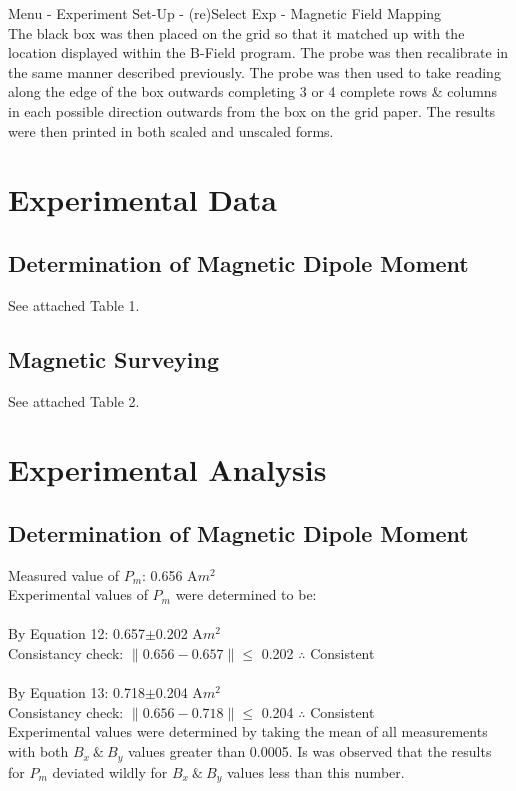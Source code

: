 \documentclass{article}
\begin{document}
Menu - Experiment Set-Up - (re)Select Exp - Magnetic Field Mapping\\

The black box was then placed on the grid so that it matched up with the location displayed within the B-Field program. The probe was then recalibrate in the same manner described previously. The probe was then used to take reading along the edge of the box outwards completing 3 or 4 complete rows \& columns in each possible direction outwards from the box on the grid paper. The results were then printed in both scaled and unscaled forms.

\section{Experimental Data}
\subsection{Determination of Magnetic Dipole Moment}
See attached Table 1.
\subsection{Magnetic Surveying}
See attached Table 2.
\section{Experimental Analysis}
\subsection{Determination of Magnetic Dipole Moment}
Measured value of $P_m$: 0.656 A$m^2$\\
Experimental values of $P_m$ were determined to be:\\\\
By Equation 12: 0.657$\pm$0.202 A$m^2$\\
Consistancy check: $\|0.656-0.657\|$$\le$ 0.202 $\therefore$ Consistent\\\\
By Equation 13: 0.718$\pm$0.204 A$m^2$\\
Consistancy check: $\|0.656-0.718\|$$\le$ 0.204 $\therefore$ Consistent\\

Experimental values were determined by taking the mean of all measurements with both $B_x\ \&\ B_y$ values greater than 0.0005. Is was observed that the results for $P_m$ deviated wildly for $B_x\ \&\ B_y$ values less than this number.\\
\end{document}
